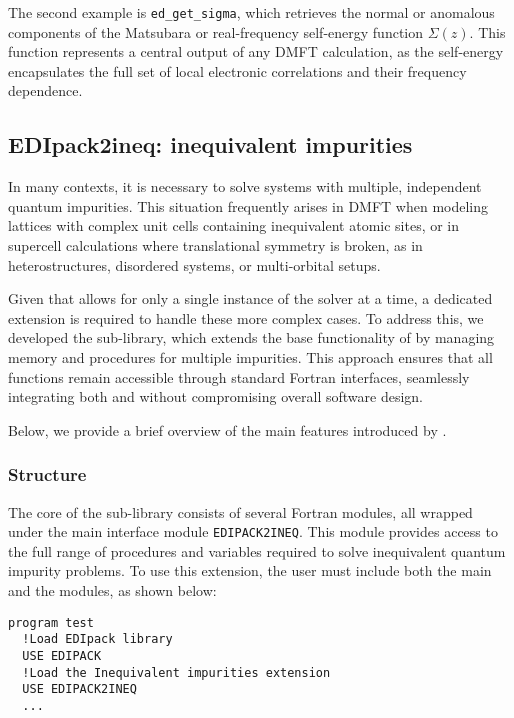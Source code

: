 \documentclass[edipack_sp.tex]{subfiles}
\begin{document}
The second example is \texttt{ed\_get\_sigma}, which retrieves the 
normal or anomalous components of the Matsubara or real-frequency 
self-energy function $\Sigma(z)$. This function represents a central 
output of any DMFT calculation, as the self-energy encapsulates the 
full set of local electronic correlations and their frequency 
dependence.







\subsection{EDIpack2ineq: inequivalent impurities}\label{sSecIneq}
In many contexts, it is necessary to solve systems with multiple, 
independent quantum impurities. This situation frequently arises in 
DMFT when modeling lattices with complex unit cells containing 
inequivalent atomic sites, or in supercell calculations where 
translational symmetry is broken, as in heterostructures, disordered 
systems, or multi-orbital setups. 

Given that \NAME allows for only a single instance of the solver at a 
time, a dedicated extension is required to handle these more complex 
cases. To address this, we developed the  
sub-library, which extends the base functionality of \NAME by managing 
memory and procedures for multiple impurities. This approach ensures 
that all functions remain accessible through standard Fortran 
interfaces, seamlessly integrating both \NAME and  
without compromising overall software design.

Below, we provide a brief overview of the main features introduced by 
.

\subsubsection{Structure}\label{ssSecIneqStructure}
The core of the  sub-library consists of several 
Fortran modules, all wrapped under the main interface module 
{\tt EDIPACK2INEQ}. This module provides access to the full range of 
procedures and variables required to solve inequivalent quantum 
impurity problems. To use this extension, the user must include both 
the main \NAME and the  modules, as shown below:
\begin{lstlisting}[style=fstyle,numbers=none,basicstyle={\scriptsize\ttfamily}]
program test
  !Load EDIpack library 
  USE EDIPACK
  !Load the Inequivalent impurities extension
  USE EDIPACK2INEQ
  ...
\end{lstlisting}
\end{document}
